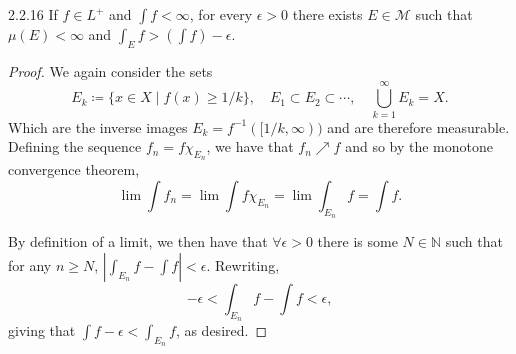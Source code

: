 \documentclass[11pt]{article}
\begin{document}
\begin{problem}{2.2.16}
	If \( f \in L^{+} \) and \( \int f < \infty \), for every \(\epsilon > 0\) there exists \( E \in \mathcal{M} \) such that \(\mu(E) < \infty\) and \( \int_E f > (\int f) - \epsilon \).
\end{problem}
\begin{proof}
	We again consider the sets
	\begin{equation}
		\label{eq:4}
		E_k \coloneq \{ x \in X\mid f(x) \geq 1/k\}, \quad E_1 \subset E_2 \subset \cdots, \quad \bigcup_{k=1}^{\infty} E_k = X.
	\end{equation}
	Which are the inverse images \( E_k = f^{-1}([1/k, \infty))  \) and are therefore measurable.
	Defining the sequence \( f_n = f\chi_{E_{n}} \), we have that \( f_n \nearrow f \) and so by the monotone convergence theorem,
	\begin{equation}
		\label{eq:5}
		\lim \int f_n = \lim \int f\chi_{E_n} = \lim \int_{E_n} f = \int f.
	\end{equation}

	By definition of a limit, we then have that \(\forall \epsilon > 0\) there is some \( N \in \mathbb{N} \) such that for any \( n \geq N \), \( |\int_{E_n} f - \int f| < \epsilon \).
	Rewriting,
	\begin{equation}
		\label{eq:6}
		- \epsilon < \int_{E_n} f - \int f < \epsilon,
	\end{equation}
	giving that \( \int f - \epsilon < \int_{E_n} f \), as desired.
\end{proof}
\end{document}
